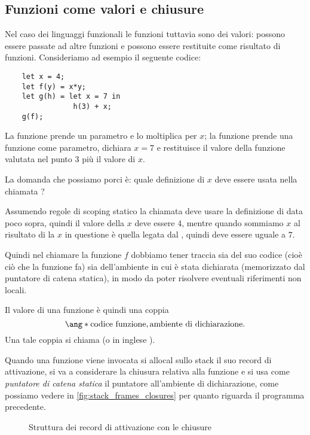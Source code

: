 \subsection*{Funzioni come valori e chiusure}

Nel caso dei linguaggi funzionali le funzioni tuttavia sono dei valori: possono essere passate ad altre funzioni e possono essere restituite come risultato di funzioni. Consideriamo ad esempio il seguente codice:
\begin{verbatim}
    let x = 4;
    let f(y) = x*y;
    let g(h) = let x = 7 in
                h(3) + x;
    g(f);
\end{verbatim}
La funzione  prende un parametro e lo moltiplica per $x$; la funzione  prende una funzione  come parametro, dichiara $x = 7$ e restituisce il valore della funzione  valutata nel punto $3$ più il valore di $x$.

La domanda che possiamo porci è: quale definizione di $x$ deve essere usata nella chiamata ?

Assumendo regole di scoping statico la chiamata  deve usare la definizione di  data poco sopra, quindi il valore della $x$ deve essere $4$, mentre quando sommiamo $x$ al risultato di  la $x$ in questione è quella legata dal , quindi deve essere uguale a $7$.

Quindi nel chiamare la funzione $f$ dobbiamo tener traccia sia del suo codice (cioè ciò che la funzione fa) sia dell'ambiente in cui è stata dichiarata (memorizzato dal puntatore di catena statica), in modo da poter risolvere eventuali riferimenti non locali.

Il valore di una funzione è quindi una coppia \[
    \ang*{\text{codice funzione}, \text{ambiente di dichiarazione}}.    
\] Una tale coppia si chiama  (o in inglese ).

Quando una funzione viene invocata si allocal sullo stack il suo record di attivazione, si va a considerare la chiusura relativa alla funzione e si usa come \emph{puntatore di catena statica} il puntatore all'ambiente di dichiarazione, come possiamo vedere in \autoref{fig:stack_frames_closures} per quanto riguarda il programma precedente.

\begin{figure}
    \centering
    
    \caption{Struttura dei record di attivazione con le chiusure}
    \label{fig:stack_frames_closures}
\end{figure}

